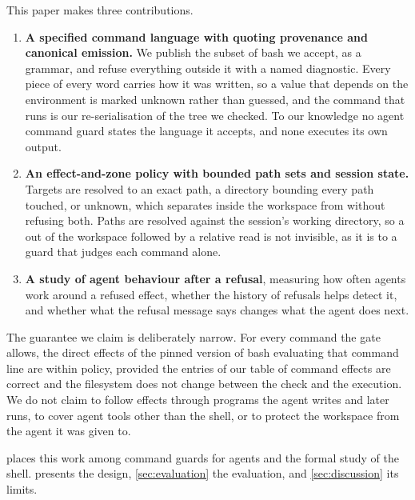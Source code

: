 This paper makes three contributions.
\begin{enumerate}
  \item \textbf{A specified command language with quoting provenance and canonical emission.}
    We publish the subset of bash we accept, as a grammar, and refuse everything outside it
    with a named diagnostic. Every piece of every word carries how it was written, so a value
    that depends on the environment is marked unknown rather than guessed, and the command that
    runs is our re-serialisation of the tree we checked. To our knowledge no agent command guard
    states the language it accepts, and none executes its own output.
  \item \textbf{An effect-and-zone policy with bounded path sets and session state.} Targets
    are resolved to an exact path, a directory bounding every path touched, or unknown, which
    separates  inside the workspace from  without refusing
    both. Paths are resolved against the session's working directory, so a  out of the
    workspace followed by a relative read is not invisible, as it is to a guard that judges
    each command alone.
  \item \textbf{A study of agent behaviour after a refusal}, measuring how often agents work
    around a refused effect, whether the history of refusals helps detect it, and whether what
    the refusal message says changes what the agent does next.
\end{enumerate}

The guarantee we claim is deliberately narrow. For every command the gate allows, the direct
effects of the pinned version of bash evaluating that command line are within policy, provided
the entries of our table of command effects are correct and the filesystem does not change
between the check and the execution. We do not claim to follow effects through programs the
agent writes and later runs, to cover agent tools other than the shell, or to protect the
workspace from the agent it was given to.

 places this work among command guards for agents and the formal study of the
shell.  presents the design, \cref{sec:evaluation} the evaluation, and
\cref{sec:discussion} its limits.
